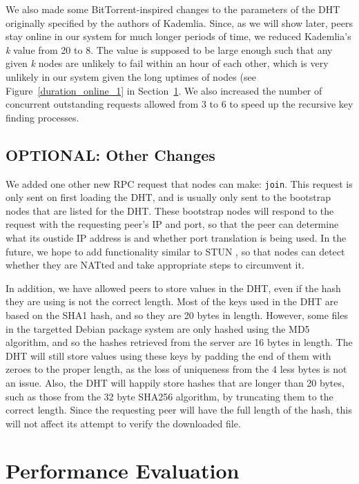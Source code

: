 \documentclass[conference]{IEEEtran}
\begin{document}
We also made some BitTorrent-inspired changes to the parameters of
the DHT originally specified by the authors of Kademlia. Since, as
we will show later, peers stay online in our system for much longer
periods of time, we reduced Kademlia's \emph{k} value from 20 to 8.
The value is supposed to be large enough such that any given
\emph{k} nodes are unlikely to fail within an hour of each other,
which is very unlikely in our system given the long uptimes of
nodes (see Figure~\ref{duration_online_1} in Section~\ref{analysis}.
We also increased the number of concurrent outstanding
requests allowed from 3 to 6 to speed up the recursive key finding
processes.

\subsection{\textbf{OPTIONAL}: Other Changes}
\label{other_changes}

We added one other new RPC request that nodes can make:
\texttt{join}. This request is only sent on first loading the DHT,
and is usually only sent to the bootstrap nodes that are listed for
the DHT. These bootstrap nodes will respond to the request with the
requesting peer's IP and port, so that the peer can determine what
its oustide IP address is and whether port translation is being
used. In the future, we hope to add functionality similar to STUN
\cite{STUN}, so that nodes can detect whether they are NATted and
take appropriate steps to circumvent it.

In addition, we have allowed peers to store values in the DHT, even
if the hash they are using is not the correct length. Most of the
keys used in the DHT are based on the SHA1 hash, and so they are 20
bytes in length. However, some files in the targetted Debian package
system are only hashed using the MD5 algorithm, and so the hashes
retrieved from the server are 16 bytes in length. The DHT will still
store values using these keys by padding the end of them with zeroes
to the proper length, as the loss of uniqueness from the 4 less
bytes is not an issue. Also, the DHT will happily store hashes that
are longer than 20 bytes, such as those from the 32 byte SHA256
algorithm, by truncating them to the correct length. Since the
requesting peer will have the full length of the hash, this will not
affect its attempt to verify the downloaded file.


\section{Performance Evaluation}
\label{analysis}
\end{document}
